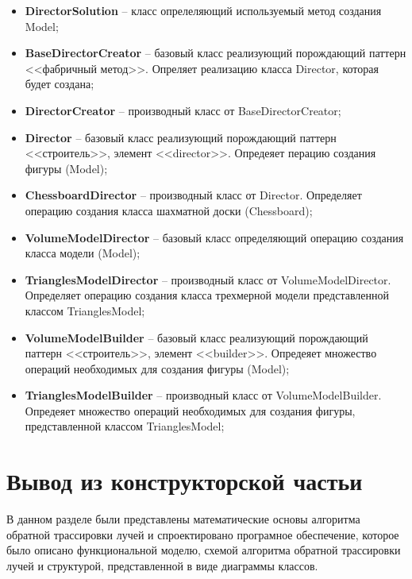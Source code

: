 \begin{itemize}
	\item \textbf{DirectorSolution} -- класс опрелеляющий используемый метод создания Model;
	\item \textbf{BaseDirectorCreator} -- базовый класс реализующий порождающий паттерн <<фабричный метод>>. Опреляет реализацию класса Director, которая будет создана;
	\item \textbf{DirectorCreator} -- производный класс от BaseDirectorCreator;
	\item \textbf{Director} -- базовый класс реализующий порождающий паттерн <<строитель>>, элемент <<director>>. Опредеяет перацию создания фигуры (Model);
	\item \textbf{ChessboardDirector} -- производный класс от Director. Определяет операцию создания класса шахматной доски (Chessboard);
	\item \textbf{VolumeModelDirector} -- базовый класс определяющий операцию создания класса модели (Model);
	\item \textbf{TrianglesModelDirector} -- производный класс от VolumeModelDirector. Определяет операцию создания класса трехмерной модели представленной классом TrianglesModel;
	\item \textbf{VolumeModelBuilder} -- базовый класс реализующий порождающий паттерн <<строитель>>, элемент <<builder>>. Опредеяет множество операций необходимых для создания фигуры (Model);
	\item \textbf{TrianglesModelBuilder} -- производный класс от VolumeModelBuilder. Опредеяет множество операций необходимых для создания фигуры, представленной классом TrianglesModel;	
\end{itemize}


\clearpage
\section*{Вывод из конструкторской частьи}
В данном разделе были представлены математические основы алгоритма обратной трассировки лучей и спроектировано програмное обеспечение, которое было описано функциональной моделю, схемой алгоритма обратной трассировки лучей и структурой, представленной в виде диаграммы классов.

\clearpage
